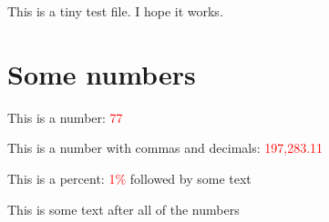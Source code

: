 \documentclass[12pt]{article}
\newcommand{\jsonsub}[2][XXXXX]{\textcolor{red}{#1}}
\begin{document}
This is a tiny test file. I hope it works.

\section{Some numbers}

This is a number: \jsonsub[77]{plainnumber}

This is a number with commas and decimals: \jsonsub[197,283.11]{comma}

This is a percent: \jsonsub[1\%]{percent} followed by some text

This is some text after all of the numbers
\end{document}

